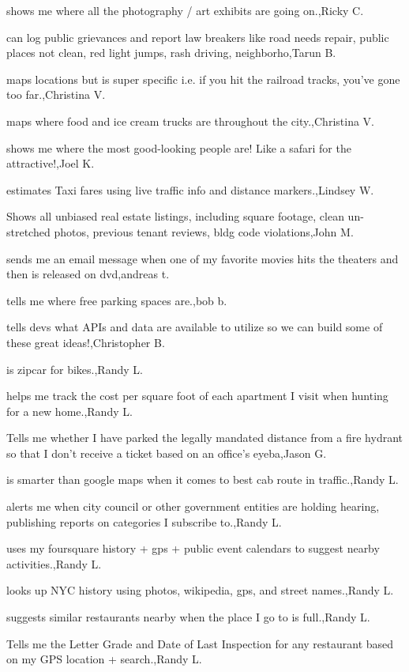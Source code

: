 \documentclass{article}
\begin{document}
shows me where all the photography / art exhibits are going on.,Ricky C.

can log public grievances and report law breakers like road needs repair, public places not clean, red light jumps, rash driving, neighborho,Tarun B.

maps locations but is super specific i.e. if you hit the railroad tracks, you've gone too far.,Christina  V.

maps where food and ice cream trucks are throughout the city.,Christina  V.

shows me where the most good-looking people are! Like a safari for the attractive!,Joel K.

estimates Taxi fares using live traffic info and distance markers.,Lindsey W.

Shows all unbiased real estate listings, including square footage, clean un-stretched photos, previous tenant reviews, bldg code violations,John M.

sends me an email message when one of my favorite movies hits the theaters and then is released on dvd,andreas t.

tells me where free parking spaces are.,bob b.

tells devs what APIs and data are available to utilize so we can build some of these great ideas!,Christopher B.

is zipcar for bikes.,Randy L.

helps me track the cost per square foot of each apartment I visit when hunting for a new home.,Randy L.

Tells me whether I have parked the legally mandated distance from a fire hydrant so that I don't receive a ticket based on an office's eyeba,Jason G.

is smarter than google maps when it comes to best cab route in traffic.,Randy L.

alerts me when city council or other government entities are holding hearing, publishing reports on categories I subscribe to.,Randy L.

uses my foursquare history + gps + public event calendars to suggest nearby activities.,Randy L.

looks up NYC history using photos, wikipedia, gps, and street names.,Randy L.

suggests similar restaurants nearby when the place I go to is full.,Randy L.

Tells me the Letter Grade and Date of Last Inspection for any restaurant based on my GPS location + search.,Randy L.
\end{document}
